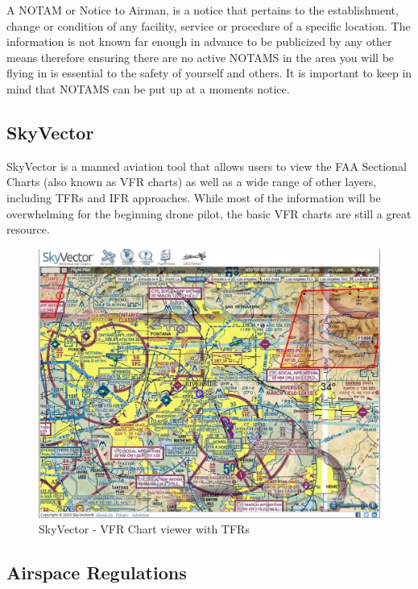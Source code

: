 \documentclass[
  12pt,
]{book}
\begin{document}
A NOTAM or Notice to Airman, is a notice that pertains to the establishment, change or condition of any facility, service or procedure of a specific location. The information is not known far enough in advance to be publicized by any other means therefore ensuring there are no active NOTAMS in the area you will be flying in is essential to the safety of yourself and others. It is important to keep in mind that NOTAMS can be put up at a moments notice.

\subsection{SkyVector}\label{skyvector}

SkyVector is a manned aviation tool that allows users to view the FAA Sectional Charts (also known as VFR charts) as well as a wide range of other layers, including TFRs and IFR approaches. While most of the information will be overwhelming for the beginning drone pilot, the basic VFR charts are still a great resource.

\begin{figure}

{\centering \includegraphics[width=0.9\linewidth]{images/skyvector} 

}

\caption{SkyVector - VFR Chart viewer with TFRs}\label{fig:skyvector}
\end{figure}

\subsection{Airspace Regulations}\label{airspace-regulations}
\end{document}
